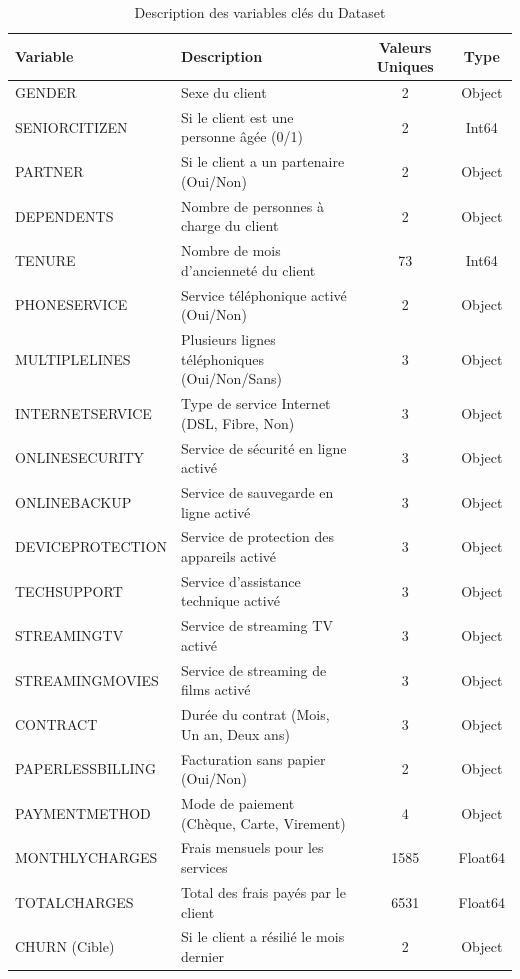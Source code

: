 \documentclass[a4paper,12pt]{report}
\begin{document}
\begin{table}[H]
\centering
\caption{Description des variables clés du Dataset}
\label{tab:variables}
\small
\begin{tabular}{llcc}
\toprule
\textbf{Variable} & \textbf{Description} & \textbf{Valeurs Uniques} & \textbf{Type} \\
\midrule
GENDER & Sexe du client & 2 & Object \\
SENIORCITIZEN & Si le client est une personne âgée (0/1) & 2 & Int64 \\
PARTNER & Si le client a un partenaire (Oui/Non) & 2 & Object \\
DEPENDENTS & Nombre de personnes à charge du client & 2 & Object \\
TENURE & Nombre de mois d'ancienneté du client & 73 & Int64 \\
PHONESERVICE & Service téléphonique activé (Oui/Non) & 2 & Object \\
MULTIPLELINES & Plusieurs lignes téléphoniques (Oui/Non/Sans) & 3 & Object \\
INTERNETSERVICE & Type de service Internet (DSL, Fibre, Non) & 3 & Object \\
ONLINESECURITY & Service de sécurité en ligne activé & 3 & Object \\
ONLINEBACKUP & Service de sauvegarde en ligne activé & 3 & Object \\
DEVICEPROTECTION & Service de protection des appareils activé & 3 & Object \\
TECHSUPPORT & Service d'assistance technique activé & 3 & Object \\
STREAMINGTV & Service de streaming TV activé & 3 & Object \\
STREAMINGMOVIES & Service de streaming de films activé & 3 & Object \\
CONTRACT & Durée du contrat (Mois, Un an, Deux ans) & 3 & Object \\
PAPERLESSBILLING & Facturation sans papier (Oui/Non) & 2 & Object \\
PAYMENTMETHOD & Mode de paiement (Chèque, Carte, Virement) & 4 & Object \\
MONTHLYCHARGES & Frais mensuels pour les services & 1585 & Float64 \\
TOTALCHARGES & Total des frais payés par le client & 6531 & Float64 \\
CHURN (Cible) & Si le client a résilié le mois dernier & 2 & Object \\
\bottomrule
\end{tabular}
\end{table}
\end{document}

